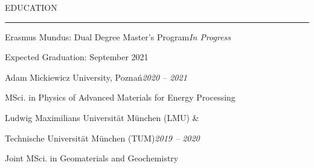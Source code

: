 \documentclass{resume} %
\renewenvironment{rSection}[1]{
	\sectionskip
	\textcolor{RoyalPurple}{\MakeUppercase{#1}}
	\sectionlineskip
	\hrule
	\begin{list}{}{
			\setlength{\leftmargin}{1.5em}
		}
		\item[]
	}{
	\end{list}
}
\begin{document}


\vspace{-2em}
	\begin{rSection}{Education} 
		
		\begin{rSubsection}{Erasmus Mundus: Dual Degree Master's Program}{\em In Progress}{}{}
				\vspace{-.4em}
				\item[] Expected Graduation: September 2021
				\vspace{-.4em}
		\end{rSubsection}
				\begin{rSubsection}{\hspace{.04\textwidth} Adam Mickiewicz University, Pozna\'n}{\em 2020 -- 2021}{}{}
					\vspace{-.4em}
					\item[] \hspace{.04\textwidth} MSci. in Physics of Advanced Materials for Energy Processing
				\end{rSubsection}
				\vspace{-.3em}
				\begin{rSubsection}{\hspace{.04\textwidth} Ludwig Maximilians Universit{\"a}t  M{\"u}nchen (LMU) \&}{}{}{}
					\item[] \vspace{-2.75em}
				\end{rSubsection}
				\begin{rSubsection}{\hspace{.04\textwidth} Technische Universit{\"a}t M{\"u}nchen (TUM)}{\em 2019 -- 2020}{}{}
					\vspace{-.4em}
					\item[] \hspace{.04\textwidth} Joint MSci. in Geomaterials and Geochemistry
				\end{rSubsection}
		

\end{rSection}
\end{document}
